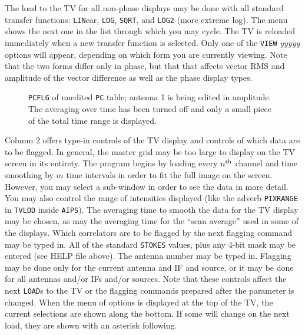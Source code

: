 \documentclass[twoside]{article}
\newcommand{\putfig}[1]{\texttt{[image: \#1.eps]}}
\begin{document}
The load to the TV for all non-phase displays may be done with all
standard transfer functions: {\tt LIN}ear, {\tt LOG}, {\tt SQRT}, and
{\tt LOG2} (more extreme log).  The menu shows the next one in the
list through which you may cycle.  The TV is reloaded immediately when
a new transfer function is selected.  Only one of the {\tt VIEW} {\it
  yyyyy} options will appear, depending on which form you are
currently viewing.  Note that the two forms differ only in phase, but
that that affects vector RMS and amplitude of the vector difference as
well as the phase display types.

\begin{figure}
\begin{center}
\resizebox{6.5in}{!}{\putfig{PCFLG}}
\caption{{\tt PCFLG} of unedited {\tt PC} table; antenna 1 is being
  edited in amplitude.  The averaging over time has been turned off
  and only a small piece of the total time range is displayed.}
\label{fig:PCFLG}
\end{center}
\end{figure}

Column 2 offers type-in controls of the TV display and controls of which
data are to be flagged.  In general, the master grid may be too large
to display on the TV screen in its entirety.  The program begins by
loading every $n^{\rm th}$ channel and time smoothing by $m$ time
intervals in order to fit the full image on the screen.  However, you
may select a sub-window in order to see the data in more detail.  You
may also control the range of intensities displayed (like the adverb
{\tt PIXRANGE} in {\tt TVLOD} inside {\tt AIPS}).  The averaging time
to smooth the data for the TV display may be chosen, as may the
averaging time for the ``scan average'' used in some of the displays.
Which correlators are to be flagged by the next flagging command may
be typed in.  All of the standard {\tt STOKES} values, plus any 4-bit
mask may be entered (see HELP file above).  The antenna number may be
typed in.  Flagging may be done only for the current antenna and IF
and source, or it may be done for all antennas and/or IFs and/or
sources.  Note that these controls affect the next {\tt LOAD}s to the
TV or the flagging commands prepared after the parameter is changed.
When the menu of options is displayed at the top of the TV, the
current selections are shown along the bottom.  If some will change on
the next load, they are shown with an asterisk following.
\end{document}

